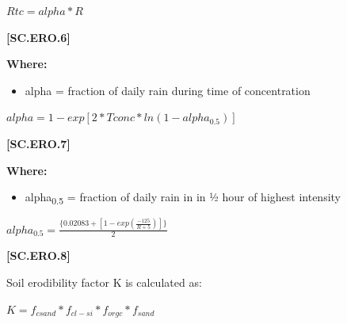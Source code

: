     \begin{center}
 \(Rtc=alpha*R\)
    \end{center}
        \vspace{0.5cm} 
    
            {\raggedleft \textbf{[SC.ERO.6]}\par}
            \vspace{0.5cm}

        \textbf{Where:}
            
        \begin{itemize}
            \item alpha	=	fraction of daily rain during time of concentration
        \end{itemize}
    \vspace{0.5cm}

    \begin{center}
 \(alpha=1-exp[2 * Tconc * ln(1-alpha_{0.5})]\)
    \end{center}
        \vspace{0.5cm} 
    
            {\raggedleft \textbf{[SC.ERO.7]}\par}
            \vspace{0.5cm}

        \textbf{Where:}
            
        \begin{itemize}
            \item alpha\textsubscript{0.5}	= fraction of daily rain in in ½ hour of highest intensity
        \end{itemize}
    \vspace{0.5cm}

    \begin{center}
 \(alpha_{0.5}= \frac{\{0.02083+[1-exp(\frac{-125}{R+5})]\}}{2}	\)
    \end{center}
        \vspace{0.5cm} 
    
            {\raggedleft \textbf{[SC.ERO.8]}\par}
            \vspace{0.5cm}

Soil erodibility factor K is calculated as:
    \vspace{0.5cm}

    \begin{center}
 \(K=f_{csand} * f_{cl-si} * f_{orgc} * f_{sand}\)
    \end{center}
        \vspace{0.5cm} 
    
